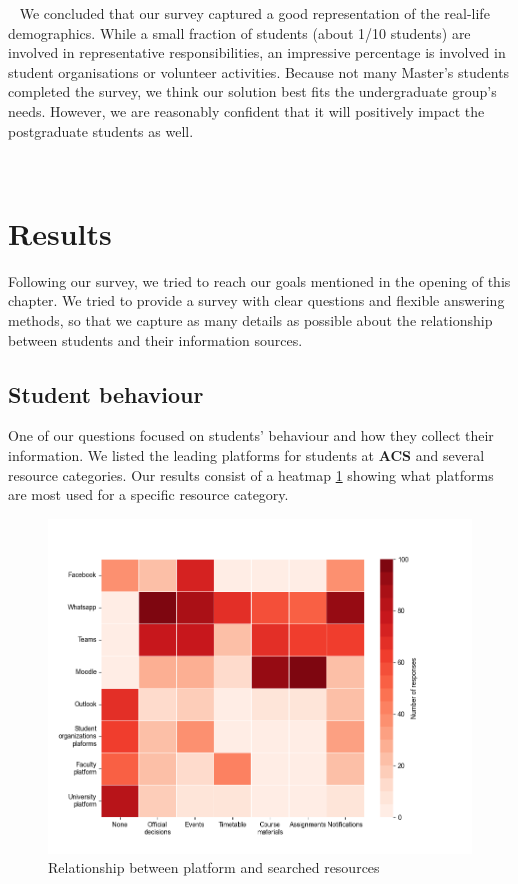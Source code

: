 ~
We concluded that our survey captured a good representation of the real-life demographics. While a small fraction of students (about 1/10 students) are involved in representative responsibilities, an impressive percentage is involved in student organisations or volunteer activities. Because not many Master's students completed the survey, we think our solution best fits the undergraduate group's needs. However, we are reasonably confident that it will positively impact the postgraduate students as well.

~

\section{Results} \label{3:results}

Following our survey, we tried to reach our goals mentioned in the opening of this chapter. We tried to provide a survey with clear questions and flexible answering methods, so that we capture as many details as possible about the relationship between students and their information sources.

\subsection{Student behaviour} \label{3:behaviour}

One of our questions focused on students' behaviour and how they collect their information. We listed the leading platforms for students at \textbf{ACS} and several resource categories. Our results consist of a heatmap \ref{3:fig:heatmap_behaviour} showing what platforms are most used for a specific resource category. 

\begin{figure}[ht]
    \centering
         \includegraphics[height=0.55\textheight]{figures/charts/survey/survey-platforms-heatmap.png}
    \caption{Relationship between platform and searched resources}
    \label{3:fig:heatmap_behaviour}
\end{figure}


